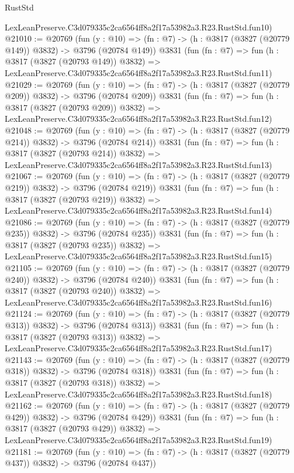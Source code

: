 \begin{lexlean}{RustStd}
\begin{coremodule}
    LexLeanPreserve.C3d079335c2ca6564ff8a2f17a53982a3.R23.RustStd.fun10)
@21010 := @20769
    (fun (y : @10) => (fn : @7) -> (h : @3817 (@3827 (@20779 @149)) @3832) -> @3796 (@20784 @149))
    @3831
    (fun (fn : @7) =>
    fun (h : @3817 (@3827 (@20793 @149)) @3832) =>
    LexLeanPreserve.C3d079335c2ca6564ff8a2f17a53982a3.R23.RustStd.fun11)
@21029 := @20769
    (fun (y : @10) => (fn : @7) -> (h : @3817 (@3827 (@20779 @209)) @3832) -> @3796 (@20784 @209))
    @3831
    (fun (fn : @7) =>
    fun (h : @3817 (@3827 (@20793 @209)) @3832) =>
    LexLeanPreserve.C3d079335c2ca6564ff8a2f17a53982a3.R23.RustStd.fun12)
@21048 := @20769
    (fun (y : @10) => (fn : @7) -> (h : @3817 (@3827 (@20779 @214)) @3832) -> @3796 (@20784 @214))
    @3831
    (fun (fn : @7) =>
    fun (h : @3817 (@3827 (@20793 @214)) @3832) =>
    LexLeanPreserve.C3d079335c2ca6564ff8a2f17a53982a3.R23.RustStd.fun13)
@21067 := @20769
    (fun (y : @10) => (fn : @7) -> (h : @3817 (@3827 (@20779 @219)) @3832) -> @3796 (@20784 @219))
    @3831
    (fun (fn : @7) =>
    fun (h : @3817 (@3827 (@20793 @219)) @3832) =>
    LexLeanPreserve.C3d079335c2ca6564ff8a2f17a53982a3.R23.RustStd.fun14)
@21086 := @20769
    (fun (y : @10) => (fn : @7) -> (h : @3817 (@3827 (@20779 @235)) @3832) -> @3796 (@20784 @235))
    @3831
    (fun (fn : @7) =>
    fun (h : @3817 (@3827 (@20793 @235)) @3832) =>
    LexLeanPreserve.C3d079335c2ca6564ff8a2f17a53982a3.R23.RustStd.fun15)
@21105 := @20769
    (fun (y : @10) => (fn : @7) -> (h : @3817 (@3827 (@20779 @240)) @3832) -> @3796 (@20784 @240))
    @3831
    (fun (fn : @7) =>
    fun (h : @3817 (@3827 (@20793 @240)) @3832) =>
    LexLeanPreserve.C3d079335c2ca6564ff8a2f17a53982a3.R23.RustStd.fun16)
@21124 := @20769
    (fun (y : @10) => (fn : @7) -> (h : @3817 (@3827 (@20779 @313)) @3832) -> @3796 (@20784 @313))
    @3831
    (fun (fn : @7) =>
    fun (h : @3817 (@3827 (@20793 @313)) @3832) =>
    LexLeanPreserve.C3d079335c2ca6564ff8a2f17a53982a3.R23.RustStd.fun17)
@21143 := @20769
    (fun (y : @10) => (fn : @7) -> (h : @3817 (@3827 (@20779 @318)) @3832) -> @3796 (@20784 @318))
    @3831
    (fun (fn : @7) =>
    fun (h : @3817 (@3827 (@20793 @318)) @3832) =>
    LexLeanPreserve.C3d079335c2ca6564ff8a2f17a53982a3.R23.RustStd.fun18)
@21162 := @20769
    (fun (y : @10) => (fn : @7) -> (h : @3817 (@3827 (@20779 @429)) @3832) -> @3796 (@20784 @429))
    @3831
    (fun (fn : @7) =>
    fun (h : @3817 (@3827 (@20793 @429)) @3832) =>
    LexLeanPreserve.C3d079335c2ca6564ff8a2f17a53982a3.R23.RustStd.fun19)
@21181 := @20769
    (fun (y : @10) => (fn : @7) -> (h : @3817 (@3827 (@20779 @437)) @3832) -> @3796 (@20784 @437))

\end{coremodule}
\end{lexlean}

